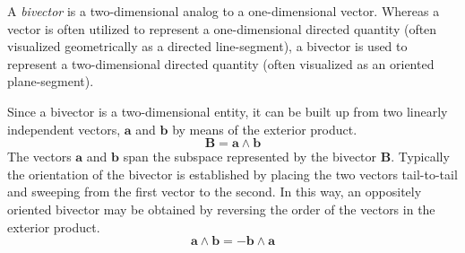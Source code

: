 \documentclass[12pt]{article}
\begin{document}
A \emph{bivector} is a two-dimensional analog to a one-dimensional vector.  Whereas a vector is often utilized to represent a one-dimensional directed quantity (often visualized geometrically as a directed line-segment), a bivector is used to represent a two-dimensional directed quantity (often visualized as an oriented plane-segment).

Since a bivector is a two-dimensional entity, it can be built up from two linearly independent vectors, $\mathbf{a}$ and $\mathbf{b}$ by means of the exterior product.
\[
\mathbf{B} = \mathbf{a} \wedge \mathbf{b}
\]
The vectors $\mathbf{a}$ and $\mathbf{b}$ span the subspace represented by the bivector $\mathbf{B}$.  Typically the orientation of the bivector is established by placing the two vectors tail-to-tail and sweeping from the first vector to the second.  In this way, an oppositely oriented bivector may be obtained by reversing the order of the vectors in the exterior product.
\[
\mathbf{a} \wedge \mathbf{b} = -\mathbf{b} \wedge \mathbf{a}
\]
\end{document}
